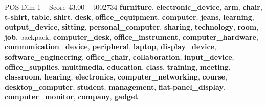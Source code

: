 \begin{textsample}{POS Dim 1 – Score 43.00 – t002734}  \label{ex:f1_pos_001}
\textbf{furniture}, \textbf{electronic\_device}, \textbf{arm}, \textbf{chair}, \textbf{t-shirt}, \textbf{table}, \textbf{shirt}, \textbf{desk}, \textbf{office\_equipment}, \textbf{computer}, \textbf{jeans}, \textbf{learning}, \textbf{output\_device}, \textbf{sitting}, \textbf{personal\_computer}, \textbf{sharing}, \textbf{technology}, \textbf{room}, \textbf{job}, backpack, \textbf{computer\_desk}, \textbf{office\_instrument}, \textbf{computer\_hardware}, \textbf{communication\_device}, \textbf{peripheral}, \textbf{laptop}, \textbf{display\_device}, \textbf{software\_engineering}, \textbf{office\_chair}, \textbf{collaboration}, \textbf{input\_device}, \textbf{office\_supplies}, \textbf{multimedia}, \textbf{education}, \textbf{class}, \textbf{training}, \textbf{meeting}, \textbf{classroom}, \textbf{hearing}, \textbf{electronics}, \textbf{computer\_networking}, \textbf{course}, \textbf{desktop\_computer}, \textbf{student}, \textbf{management}, \textbf{flat-panel\_display}, \textbf{computer\_monitor}, \textbf{company}, \textbf{gadget}

\end{textsample}
